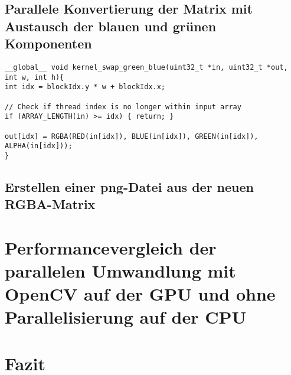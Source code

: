 \documentclass{llncs}
\begin{document}
\subsection{Parallele Konvertierung der Matrix mit Austausch der blauen und grünen Komponenten}
%
\begin{lstlisting}
__global__ void kernel_swap_green_blue(uint32_t *in, uint32_t *out, int w, int h){
int idx = blockIdx.y * w + blockIdx.x;

// Check if thread index is no longer within input array
if (ARRAY_LENGTH(in) >= idx) { return; }

out[idx] = RGBA(RED(in[idx]), BLUE(in[idx]), GREEN(in[idx]), ALPHA(in[idx]));
}
\end{lstlisting}
%
\subsection{Erstellen einer png-Datei aus der neuen RGBA-Matrix}
%

%
\section{Performancevergleich der parallelen Umwandlung mit OpenCV auf der GPU und ohne Parallelisierung auf der CPU}
%

%
\section{Fazit}
%

%
\newpage
%



%
\end{document}
